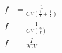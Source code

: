 \documentclass[12pt]{article}
\begin{document}
\begin{align*}
f &= \frac{1}{CV \left( \frac{1}{I} + \frac{1}{I} \right)}\\
f &= \frac{1}{CV \left( \frac{2}{I}\right)}\\
f &= \frac{I}{2CV}
\end{align*}
\end{document}
